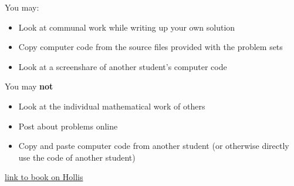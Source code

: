 \documentclass[12pt,letterpaper,noanswers]{exam}
\begin{document}
\noindent You may:
\begin{itemize}
\itemsep-0.2em
    \item Look at communal work while writing up your own solution
    \item Copy computer code from the source files provided with the problem sets
    \item Look at a screenshare of another student's computer code
\end{itemize}

\noindent You may \textbf{not}
\begin{itemize}
\itemsep-0.2em
    \item Look at the individual mathematical work of others
    \item Post about problems online
    \item Copy and paste computer code from another student (or otherwise directly use the code of another student)
\end{itemize}

\eject

{\color{blue}\href{https://hollis.harvard.edu/primo-explore/fulldisplay?docid=01HVD_ALMA512272214860003941&context=L&vid=HVD2&lang=en_US&search_scope=everything&adaptor=Local%20Search%20Engine&tab=everything&query=any,contains,strogatz%20nonlinear&offset=0}{link to book on Hollis}}
\end{document}
